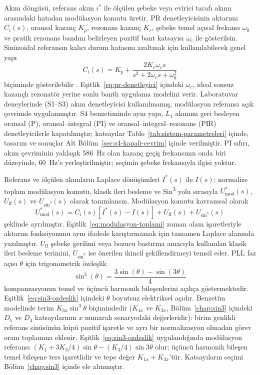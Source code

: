Akım döngüsü, referans akım $i^{\ast}$ ile ölçülen şebeke veya evirici tarafı akımı arasındaki hatadan modülasyon komutu üretir. PR denetleyicisinin aktarımı $C_i(s)$, oransal kazanç $K_p$, rezonans kazanç $K_r$, şebeke temel açısal frekansı $\omega_0$ ve pratik rezonans bandını belirleyen pozitif bant katsayısı $\omega_c$ ile gösterilsin. Sinüzoidal referansın kalıcı durum hatasını azaltmak için kullanılabilecek genel yapı
\begin{equation}
  C_i(s)=K_p+\frac{2K_r\omega_c s}{s^2+2\omega_c s+\omega_0^2}
  \label{eq:pr-denetleyici}
\end{equation}
biçiminde gösterilebilir \citep{Teodorescu2006PR,Zhang2014PR}. Eşitlik~\eqref{eq:pr-denetleyici} içindeki $\omega_c$, ideal sonsuz kazançlı rezonatör yerine sonlu bantlı uygulama modelini verir. Laboratuvar deneylerinde (S1--S3) akım denetleyicisi kullanılmamış, modülasyon referansı açık çevrimde uygulanmıştır. S4 benzetiminde aynı yapı, $L_1$ akımını geri besleyen oransal (P), oransal--integral (PI) ve oransal--integral--rezonans (PIR) denetleyicilerle kapatılmıştır; katsayılar Tablo~\ref{tab:sistem-parametreleri} içinde, tasarım ve sonuçlar Alt Bölüm~\ref{sec:s4-kapali-cevrim} içinde verilmiştir. PI sıfırı, akım çevriminin yaklaşık \SI{586}{\hertz} olan kazanç geçiş frekansının onda biri düzeyinde, \SI{60}{\hertz}'e yerleştirilmiştir; seçimin şebeke frekansıyla ilgisi yoktur.

Referans ve ölçülen akımların Laplace dönüşümleri $I^{\ast}(s)$ ile $I(s)$; normalize toplam modülasyon komutu, klasik ileri besleme ve Sin\textsuperscript{3} yolu sırasıyla $U_{\mathrm{mod}}^{\ast}(s)$, $U_{\mathrm{ff}}(s)$ ve $U_{\sin^3}(s)$ olarak tanımlansın. Modülasyon komutu kavramsal olarak
\begin{equation}
  U_{\mathrm{mod}}^{\ast}(s)=C_i(s)\left[I^{\ast}(s)-I(s)\right]+U_{\mathrm{ff}}(s)+U_{\sin^3}(s)
  \label{eq:modulasyon-toplami}
\end{equation}
şeklinde ayrılmıştır. Eşitlik~\eqref{eq:modulasyon-toplami} zaman alanı işaretleriyle aktarım fonksiyonunu aynı ifadede karıştırmamak için tamamen Laplace alanında yazılmıştır. $U_{\mathrm{ff}}$ şebeke gerilimi veya bozucu bastırma amacıyla kullanılan klasik ileri besleme terimini, $U_{\sin^3}$ ise önerilen ikincil şekillendirmeyi temsil eder. PLL faz açısı $\theta$ için trigonometrik özdeşlik
\begin{equation}
  \sin^3(\theta)=\frac{3\sin(\theta)-\sin(3\theta)}{4}
  \label{eq:sin3-ozdeslik}
\end{equation}
kompanzasyonun temel ve üçüncü harmonik bileşenlerini açıkça göstermektedir. Eşitlik~\eqref{eq:sin3-ozdeslik} içindeki $\theta$ boyutsuz elektriksel açıdır. Benzetim modelinde terim $K_{3x}\sin^3\theta$ biçimindedir ($K_{1x}$ ve $K_{3x}$, Bölüm~\ref{chap:sin3} içindeki $D_1$ ve $D_3$ katsayılarının $x$ numaralı senaryodaki değerleridir): birim genlikli referans sinüsünün küpü pozitif işaretle ve ayrı bir normalizasyon olmadan görev oranı toplamına eklenir. Eşitlik~\eqref{eq:sin3-ozdeslik} uygulandığında modülasyon referansı $(K_1+3K_3/4)\sin\theta-(K_3/4)\sin3\theta$ olur; üçüncü harmonik bileşen temel bileşene ters işaretlidir ve tepe değer $K_{1x}+K_{3x}$'tür. Katsayıların seçimi Bölüm~\ref{chap:sin3} içinde ele alınmıştır.


